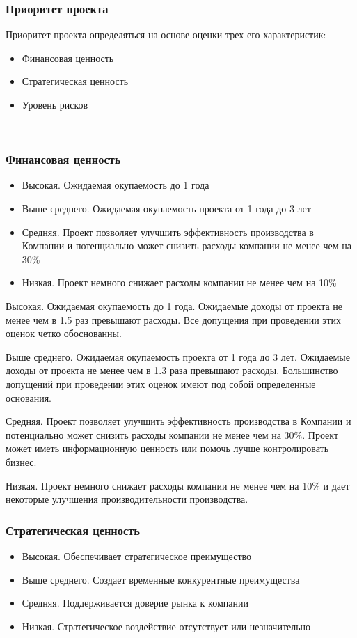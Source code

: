 \documentclass{../industrial-development}
\begin{document}
    \begin{frame} \frametitle{Приоритет проекта}
	Приоритет проекта определяться на основе оценки трех его характеристик:
	
	\begin{itemize}
		\item Финансовая ценность
		\item Стратегическая ценность
		\item Уровень рисков
	\end{itemize}
    \end{frame}
    \lecturenotes
-

    \begin{frame} \frametitle{Финансовая ценность}
	\begin{itemize}
		\item Высокая. Ожидаемая окупаемость до 1 года
		\item Выше среднего. Ожидаемая окупаемость проекта от 1 года до 3 лет
		\item Средняя. Проект позволяет улучшить эффективность производства в Компании и потенциально может снизить расходы компании не менее чем на 30\%
		\item Низкая. Проект немного снижает расходы компании не менее чем на 10\%
	\end{itemize}
    \end{frame}
    \lecturenotes

Высокая. Ожидаемая окупаемость до 1 года. Ожидаемые доходы от проекта не менее чем в 1.5 раз превышают расходы. Все допущения при проведении этих оценок четко обоснованны.

Выше среднего. Ожидаемая окупаемость проекта от 1 года до 3 лет. Ожидаемые доходы от проекта не менее чем в 1.3 раза превышают расходы. Большинство допущений при проведении этих оценок имеют под собой определенные основания.

Средняя. Проект позволяет улучшить эффективность производства в Компании и потенциально может снизить расходы компании не менее чем на 30\%. Проект может иметь информационную ценность или помочь лучше контролировать бизнес.

Низкая. Проект немного снижает расходы компании не менее чем на 10\% и дает некоторые улучшения производительности производства.

    \begin{frame} \frametitle{Стратегическая ценность}
	\begin{itemize}
		\item Высокая. Обеспечивает стратегическое преимущество
		\item Выше среднего. Создает временные конкурентные преимущества
		\item Средняя. Поддерживается доверие рынка к компании
		\item Низкая. Стратегическое воздействие отсутствует или незначительно
	\end{itemize}
    \end{frame}
    \lecturenotes
\end{document}

